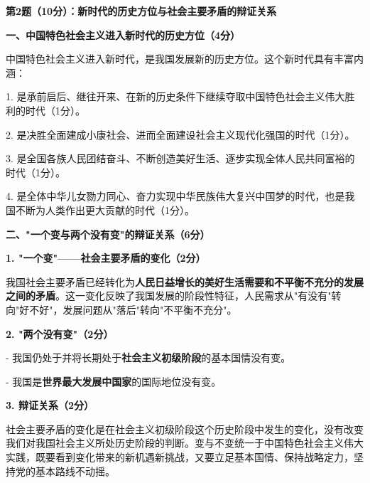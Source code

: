 \documentclass[12pt, a4paper]{article}
\begin{document}
\vspace{6pt}

\begin{answerbox}

\textbf{第2题（10分）：新时代的历史方位与社会主要矛盾的辩证关系}

\textbf{一、中国特色社会主义进入新时代的历史方位（4分）}

中国特色社会主义进入新时代，是我国发展新的历史方位。这个新时代具有丰富内涵：

1. 是承前启后、继往开来、在新的历史条件下继续夺取中国特色社会主义伟大胜利的时代（1分）。

2. 是决胜全面建成小康社会、进而全面建设社会主义现代化强国的时代（1分）。

3. 是全国各族人民团结奋斗、不断创造美好生活、逐步实现全体人民共同富裕的时代（1分）。

4. 是全体中华儿女勠力同心、奋力实现中华民族伟大复兴中国梦的时代，也是我国不断为人类作出更大贡献的时代（1分）。

\textbf{二、"一个变与两个没有变"的辩证关系（6分）}

\textbf{1. "一个变"——社会主要矛盾的变化（2分）}

我国社会主要矛盾已经转化为\textbf{人民日益增长的美好生活需要和不平衡不充分的发展之间的矛盾}。这一变化反映了我国发展的阶段性特征，人民需求从"有没有"转向"好不好"，发展问题从"落后"转向"不平衡不充分"。

\textbf{2. "两个没有变"（2分）}

- 我国仍处于并将长期处于\textbf{社会主义初级阶段}的基本国情没有变。

- 我国是\textbf{世界最大发展中国家}的国际地位没有变。

\textbf{3. 辩证关系（2分）}

社会主要矛盾的变化是在社会主义初级阶段这个历史阶段中发生的变化，没有改变我们对我国社会主义所处历史阶段的判断。变与不变统一于中国特色社会主义伟大实践，既要看到变化带来的新机遇新挑战，又要立足基本国情、保持战略定力，坚持党的基本路线不动摇。

\end{answerbox}

\vspace{6pt}
\end{document}
